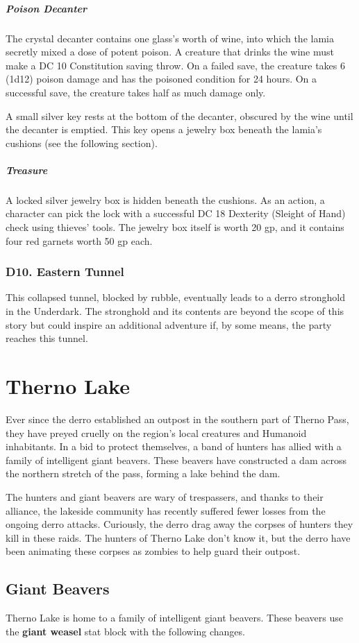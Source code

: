 \documentclass[10pt,a4paper,twoside,bg=print,twocolumn,openany,nodeprecatedcode]{dndbook}
\begin{document}
\subparagraph{Poison Decanter}
The crystal decanter contains one glass's worth of wine, into which the lamia secretly mixed a dose of potent poison. A creature that drinks the wine must make a DC 10 Constitution saving throw. On a failed save, the creature takes 6 (1d12) poison damage and has the poisoned condition for 24 hours. On a successful save, the creature takes half as much damage only.

A small silver key rests at the bottom of the decanter, obscured by the wine until the decanter is emptied. This key opens a jewelry box beneath the lamia's cushions (see the following section).

\subparagraph{Treasure}
A locked silver jewelry box is hidden beneath the cushions. As an action, a character can pick the lock with a successful DC 18 Dexterity (Sleight of Hand) check using thieves' tools. The jewelry box itself is worth 20 gp, and it contains four red garnets worth 50 gp each.

\subsubsection{D10. Eastern Tunnel}
This collapsed tunnel, blocked by rubble, eventually leads to a derro stronghold in the Underdark. The stronghold and its contents are beyond the scope of this story but could inspire an additional adventure if, by some means, the party reaches this tunnel.

\section{Therno Lake}
Ever since the derro established an outpost in the southern part of Therno Pass, they have preyed cruelly on the region's local creatures and Humanoid inhabitants. In a bid to protect themselves, a band of hunters has allied with a family of intelligent giant beavers. These beavers have constructed a dam across the northern stretch of the pass, forming a lake behind the dam.

The hunters and giant beavers are wary of trespassers, and thanks to their alliance, the lakeside community has recently suffered fewer losses from the ongoing derro attacks. Curiously, the derro drag away the corpses of hunters they kill in these raids. The hunters of Therno Lake don't know it, but the derro have been animating these corpses as zombies to help guard their outpost.

\subsection{Giant Beavers}
Therno Lake is home to a family of intelligent giant beavers. These beavers use the \textbf{giant weasel} stat block with the following changes.
\end{document}
